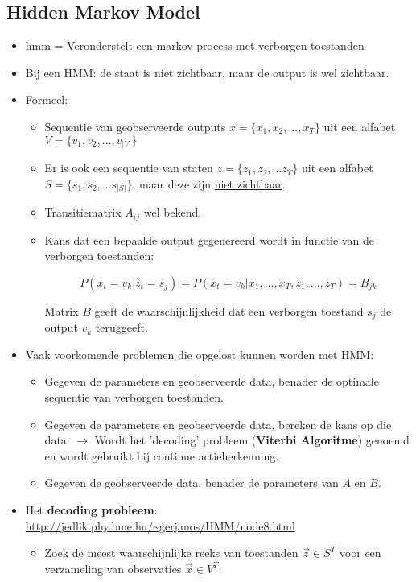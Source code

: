 \subsection{Hidden Markov Model}
\begin{itemize}
	\item \gls{hmm} = Veronderstelt een markov process met verborgen toestanden
	\item Bij een HMM: de staat is niet zichtbaar, maar de output is wel zichtbaar.
	\item Formeel:
	\begin{itemize}
		\item Sequentie van geobserveerde outputs $x = \{x_1, x_2, ..., x_T\}$  uit een alfabet $V = \{v_1, v_2, ..., v_{|V|}\}$
		\item Er is ook een sequentie van staten $z =\{z_1, z_2, ... z_T\}$ uit een alfabet $S = \{s_1, s_2, ... s_{|S|}\}$, maar deze zijn \underline{niet zichtbaar}.
		\item Transitiematrix $A_{ij}$ wel bekend.
		\item Kans dat een bepaalde output gegenereerd wordt in functie van de verborgen toestanden:
		
		$$P(x_t = v_k|z_t = s_j) = P(x_t = v_k | x_1, ..., x_T, z_1, ..., z_T) = B_{jk}$$
		
		Matrix $B$ geeft de waarschijnlijkheid dat een verborgen toestand $s_j$ de output $v_k$ teruggeeft.
	\end{itemize}
	\item Vaak voorkomende problemen die opgelost kunnen worden met HMM:
	\begin{itemize}
		\item Gegeven de parameters en geobserveerde data, benader de optimale sequentie van verborgen toestanden.
		\item Gegeven de parameters en geobserveerde data, bereken de kans op die data. $\rightarrow$ Wordt het 'decoding' probleem (\textbf{Viterbi Algoritme}) genoemd en wordt gebruikt bij continue actieherkenning.
		\item Gegeven de geobserveerde data, benader de parameters van $A$ en $B$.
	\end{itemize}
	\item Het \textbf{decoding probleem}: \url{http://jedlik.phy.bme.hu/~gerjanos/HMM/node8.html}
	\begin{itemize}
		\item Zoek de meest waarschijnlijke reeks van toestanden $\vec{z} \in S^T$ voor een verzameling van observaties $\vec{x} \in V^T$.
		

\end{itemize}
\end{itemize}
